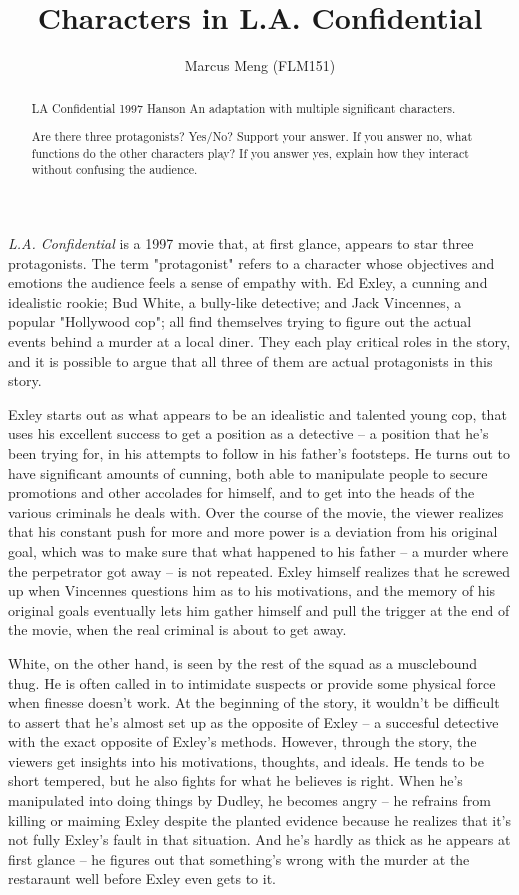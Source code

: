 \documentclass{article}
\title{Characters in L.A. Confidential}
\author{Marcus Meng (FLM151)}
\begin{document}
\maketitle

\begin{abstract}

LA Confidential 1997 Hanson An adaptation with multiple significant characters.

Are there three protagonists? Yes/No? Support your answer. If you answer no, what functions do the other characters play? If you answer yes, explain how they interact without confusing the audience.

\end{abstract}

\emph{L.A. Confidential} is a 1997 movie that, at first glance, appears to star three protagonists.
The term "protagonist" refers to a character whose objectives and emotions the audience feels a sense of empathy with.
Ed Exley, a cunning and idealistic rookie; Bud White, a bully-like detective; and Jack Vincennes, a popular "Hollywood cop"; all find themselves trying to figure out the actual events behind a murder at a local diner.
They each play critical roles in the story, and it is possible to argue that all three of them are actual protagonists in this story.

Exley starts out as what appears to be an idealistic and talented young cop, that uses his excellent success to get a position as a detective -- a position that he's been trying for, in his attempts to follow in his father's footsteps.
He turns out to have significant amounts of cunning, both able to manipulate people to secure promotions and other accolades for himself, and to get into the heads of the various criminals he deals with.
Over the course of the movie, the viewer realizes that his constant push for more and more power is a deviation from his original goal, which was to make sure that what happened to his father -- a murder where the perpetrator got away -- is not repeated.
Exley himself realizes that he screwed up when Vincennes questions him as to his motivations, and the memory of his original goals eventually lets him gather himself and pull the trigger at the end of the movie, when the real criminal is about to get away.

White, on the other hand, is seen by the rest of the squad as a musclebound thug.
He is often called in to intimidate suspects or provide some physical force when finesse doesn't work.
At the beginning of the story, it wouldn't be difficult to assert that he's almost set up as the opposite of Exley -- a succesful detective with the exact opposite of Exley's methods.
However, through the story, the viewers get insights into his motivations, thoughts, and ideals.
He tends to be short tempered, but he also fights for what he believes is right.
When he's manipulated into doing things by Dudley, he becomes angry -- he refrains from killing or maiming Exley despite the planted evidence because he realizes that it's not fully Exley's fault in that situation.
And he's hardly as thick as he appears at first glance -- he figures out that something's wrong with the murder at the restaraunt well before Exley even gets to it.
\end{document}
